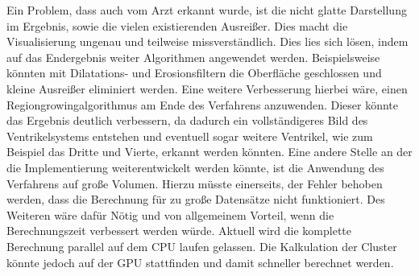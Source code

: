\newline
Ein Problem, dass auch vom Arzt erkannt wurde, ist die nicht glatte Darstellung im Ergebnis, sowie die vielen existierenden Ausreißer. Dies macht die Visualisierung ungenau und teilweise missverständlich.
\newline
Dies lies sich lösen, indem auf das Endergebnis weiter Algorithmen angewendet werden. Beispielsweise könnten mit Dilatations- und Erosionsfiltern die Oberfläche geschlossen und kleine Ausreißer eliminiert werden. Eine weitere Verbesserung hierbei wäre, einen Regiongrowingalgorithmus am Ende des Verfahrens anzuwenden. Dieser könnte das Ergebnis deutlich verbessern, da dadurch ein vollständigeres Bild des Ventrikelsystems entstehen und eventuell sogar weitere Ventrikel, wie zum Beispiel das Dritte und Vierte, erkannt werden könnten.
\newline
Eine andere Stelle an der die Implementierung weiterentwickelt werden könnte, ist die Anwendung des Verfahrens auf große Volumen. Hierzu müsste einerseits, der Fehler behoben werden, dass die Berechnung für zu große Datensätze nicht funktioniert. Des Weiteren wäre dafür Nötig und von allgemeinem Vorteil, wenn die Berechnungszeit verbessert werden würde. Aktuell wird die komplette Berechnung parallel auf dem CPU laufen gelassen. Die Kalkulation der Cluster könnte jedoch auf der GPU stattfinden und damit schneller berechnet werden.

